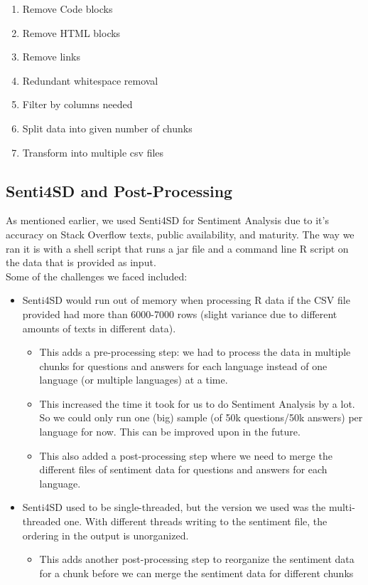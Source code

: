\documentclass[conference]{IEEEtran}
\begin{document}
\begin{enumerate}
    \item Remove Code blocks
    \item Remove HTML blocks
    \item Remove links
    \item Redundant whitespace removal
    \item Filter by columns needed
    \item Split data into given number of chunks
    \item Transform into multiple csv files\\
\end{enumerate}

\subsection{Senti4SD and Post-Processing}
As mentioned earlier, we used Senti4SD for Sentiment Analysis due to it's accuracy on Stack Overflow texts, public availability, and maturity. The way we ran it is with a shell script that runs a jar file and a command line R script on the data that is provided as input.\\

Some of the challenges we faced included:
\begin{itemize}
    \item Senti4SD would run out of memory when processing R data if the CSV file provided had more than 6000-7000 rows (slight variance due to different amounts of texts in different data).
    \begin{itemize}
        \item This adds a pre-processing step: we had to process the data in multiple chunks for questions and answers for each language instead of one language (or multiple languages) at a time.
        \item This increased the time it took for us to do Sentiment Analysis by a lot. So we could only run one (big) sample (of 50k questions/50k answers) per language for now. This can be improved upon in the future.
        \item This also added a post-processing step where we need to merge the different files of sentiment data for questions and answers for each language.
    \end{itemize}
    \item Senti4SD used to be single-threaded, but the version we used was the multi-threaded one. With different threads writing to the sentiment file, the ordering in the output is unorganized. 
    \begin{itemize}
        \item This adds another post-processing step to reorganize the sentiment data for a chunk before we can merge the sentiment data for different chunks\\
    \end{itemize}
\end{itemize}
\end{document}
